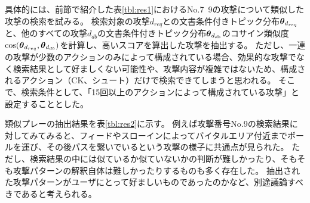 具体的には、前節で紹介した表\ref{tbl:res1}におけるNo.7~9の攻撃について類似した攻撃の検索を試みる。
検索対象の攻撃$d_{req}$との文書条件付きトピック分布$\mbox{\boldmath $\theta$}_{d_{req}}$と、他のすべての攻撃$d_{db}$の文書条件付きトピック分布$\mbox{\boldmath $\theta$}_{d_{db}}$のコサイン類似度$\cos(\mbox{\boldmath $\theta$}_{d_{req}},\mbox{\boldmath $\theta$}_{d_{db}})$を計算し、高いスコアを算出した攻撃を抽出する。
ただし、一連の攻撃が少数のアクションのみによって構成されている場合、効果的な攻撃でなく検索結果として好ましくない可能性や、攻撃内容が複雑ではないため、構成されるアクション（CK、シュート）だけで検索できてしまうと思われる。
そこで、検索条件として、「15回以上のアクションによって構成されている攻撃」と設定することとした。

類似プレーの抽出結果を表\ref{tbl:res2}に示す。
例えば攻撃番号No.9の検索結果に対してみてみると、フィードやスローインによってバイタルエリア付近までボールを運び、その後パスを繋いでいるという攻撃の様子に共通点が見られた。
ただし、検索結果の中には似ているか似ていないかの判断が難しかったり、そもそも攻撃パターンの解釈自体は難しかったりするものも多く存在した。
抽出された攻撃パターンがユーザにとって好ましいものであったのかなど、別途議論すべきであると考えられる。


